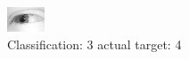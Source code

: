 \begin{figure}[h!]
\begin{center}
\includegraphics[width=0.60\columnwidth]{figures/ID2432_class_3_target_4.png}
\end{center}
\caption{ Classification: 3 actual target: 4}
\label{fig:ID2432_class_3_target_4}
\end{figure}
